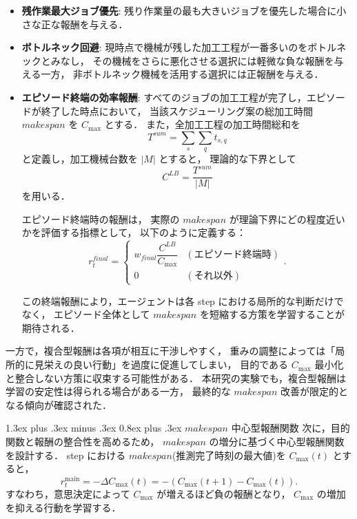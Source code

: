 \documentclass{jarticle}
\makeatletter
\renewcommand{\subsubsection}{%
  \@startsection{subsubsection}{3}{\z@}%
  {1.3ex plus .3ex minus .3ex}%
  {0.8ex plus .3ex}%
  {\LARGE\bfseries}%
}
\makeatother
\begin{document}
\begin{itemize}
  \item \textbf{残作業最大ジョブ優先}:
  残り作業量の最も大きいジョブを優先した場合に小さな正な報酬を与える．

  \item \textbf{ボトルネック回避}:
  現時点で機械が残した加工工程が一番多いのをボトルネックとみなし，
  その機械をさらに悪化させる選択には軽微な負な報酬を与える一方，
  非ボトルネック機械を活用する選択には正報酬を与える．

  \item \textbf{エピソード終端の効率報酬}:
  すべてのジョブの加工工程が完了し，エピソードが終了した時点において，
  当該スケジューリング案の総加工時間 $makespan$ を $C_{\max}$ とする．
  また，全加工工程の加工時間総和を
  \begin{equation}
  T^{sum} = \sum_{s} \sum_{q} t_{s,q}
  \end{equation}
  と定義し，加工機械台数を $|M|$ とすると，
  理論的な下界として
  \begin{equation}
  C^{LB} = \frac{T^{sum}}{|M|}
  \end{equation}
  を用いる．

  エピソード終端時の報酬は，
  実際の $makespan$ が理論下界にどの程度近いかを評価する指標として，
  以下のように定義する：
  \begin{equation}
  r^{final}_t =
  \begin{cases}
  w_{final} \dfrac{C^{LB}}{C_{\max}} & (\text{エピソード終端時}) \\
  0 & (\text{それ以外})
  \end{cases}.
  \end{equation}

  この終端報酬により，エージェントは各 step における局所的な判断だけでなく，
  エピソード全体として $makespan$ を短縮する方策を学習することが期待される．
\end{itemize}


一方で，複合型報酬は各項が相互に干渉しやすく，
重みの調整によっては「局所的に見栄えの良い行動」を過度に促進してしまい，
目的である $C_{\max}$ 最小化と整合しない方策に収束する可能性がある．
本研究の実験でも，複合型報酬は学習の安定性は得られる場合がある一方，
最終的な $makespan$ 改善が限定的となる傾向が確認された．

\subsubsection{$makespan$ 中心型報酬関数}
次に，目的関数と報酬の整合性を高めるため，
$makespan$ の増分に基づく中心型報酬関数を設計する．
step における $makespan$(推測完了時刻の最大値)を $C_{\max}(t)$ とすると，
\begin{equation}
\label{eq:reward_delta_cmax}
r_t^{\mathrm{main}} = -\Delta C_{\max}(t) = -\left(C_{\max}(t+1)-C_{\max}(t)\right).
\end{equation}
すなわち，意思決定によって $C_{\max}$ が増えるほど負の報酬となり，
$C_{\max}$ の増加を抑える行動を学習する．
\end{document}
